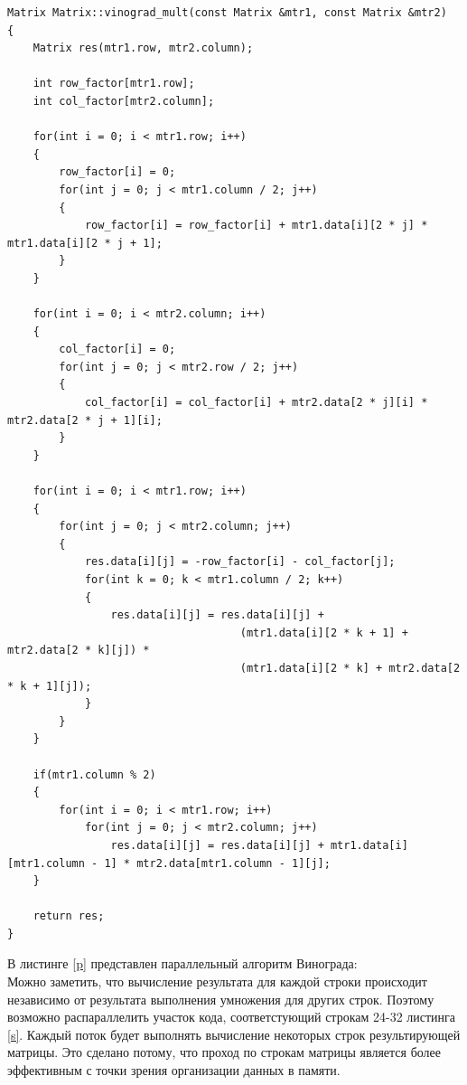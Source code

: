 \documentclass[12pt]{report}
\begin{document}
\begin{lstlisting}[label=s,caption=Стандартный алгоритм Винограда]
Matrix Matrix::vinograd_mult(const Matrix &mtr1, const Matrix &mtr2)
{
    Matrix res(mtr1.row, mtr2.column);

    int row_factor[mtr1.row];
    int col_factor[mtr2.column];

    for(int i = 0; i < mtr1.row; i++)
    {
        row_factor[i] = 0;
        for(int j = 0; j < mtr1.column / 2; j++)
        {
            row_factor[i] = row_factor[i] + mtr1.data[i][2 * j] * mtr1.data[i][2 * j + 1];
        }
    }

    for(int i = 0; i < mtr2.column; i++)
    {
        col_factor[i] = 0;
        for(int j = 0; j < mtr2.row / 2; j++)
        {
            col_factor[i] = col_factor[i] + mtr2.data[2 * j][i] * mtr2.data[2 * j + 1][i];
        }
    }

    for(int i = 0; i < mtr1.row; i++)
    {
        for(int j = 0; j < mtr2.column; j++)
        {
            res.data[i][j] = -row_factor[i] - col_factor[j];
            for(int k = 0; k < mtr1.column / 2; k++)
            {
                res.data[i][j] = res.data[i][j] +
                                    (mtr1.data[i][2 * k + 1] + mtr2.data[2 * k][j]) *
                                    (mtr1.data[i][2 * k] + mtr2.data[2 * k + 1][j]);
            }
        }
    }
    
    if(mtr1.column % 2)
    {
        for(int i = 0; i < mtr1.row; i++)
            for(int j = 0; j < mtr2.column; j++)
                res.data[i][j] = res.data[i][j] + mtr1.data[i][mtr1.column - 1] * mtr2.data[mtr1.column - 1][j];
    }

    return res;
}
\end{lstlisting}


В листинге \ref{p} представлен параллельный алгоритм Винограда:\\
	
	Можно заметить, что вычисление результата для каждой строки происходит независимо от результата выполнения умножения для других строк. Поэтому возможно распараллелить участок кода, соответстующий строкам 24-32 листинга \ref{s}. Каждый поток будет выполнять вычисление некоторых строк результирующей матрицы. Это сделано потому, что проход по строкам матрицы является более эффективным с точки зрения организации данных в памяти.
\end{document}
